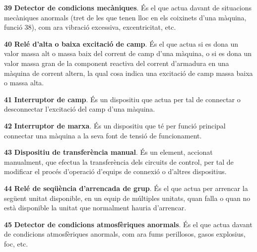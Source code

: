 \begin{multicols}{2}
\begin{list}{}
\item[\textbf{39}]  
\textbf{Detector de condicions mecàniques}. És el que actua davant
de situacions mecàniques anormals (tret de les que tenen lloc en els
coixinets d'una màquina, funció 38), com ara vibració excessiva,
excentricitat, etc.

\item[\textbf{40}]  
 \textbf{Relé d'alta o baixa excitació de camp}. És el que actua si es dona un valor massa alt o massa baix del corrent de camp d'una màquina, o si es dona un valor
massa gran de la component reactiva del corrent d'armadura en una màquina de corrent
altern, la qual cosa indica una excitació de camp massa baixa o massa alta.

\item[\textbf{41}]   
\textbf{Interruptor de camp}. És un dispositiu
que actua per tal de connectar o desconnectar l'excitació del camp
d'una màquina.

\item[\textbf{42}]   
\textbf{Interruptor de marxa}. És un
dispositiu que té per funció principal connectar una màquina a la
seva font de tensió de funcionament.

\item[\textbf{43}]  
 \textbf{Dispositiu de transferència manual}. És
un element, accionat manualment, que efectua la transferència dels circuits de control, per tal
 de modificar el procés d'operació d'equips de connexió o d'altres dispositius.

\item[\textbf{44}]   
\textbf{Relé de seqüència d'arrencada de grup}. És el que actua per arrencar la següent unitat
disponible, en un equip de múltiples unitats, quan falla o quan no
està disponible la unitat que normalment hauria d'arrencar.

\item[\textbf{45}]   
\textbf{Detector de condicions atmosfèriques anormals}. És el que actua davant de condicions atmosfèriques anormals, com ara fums
perillosos, gasos explosius, foc, etc.


\end{list}
\end{multicols}
